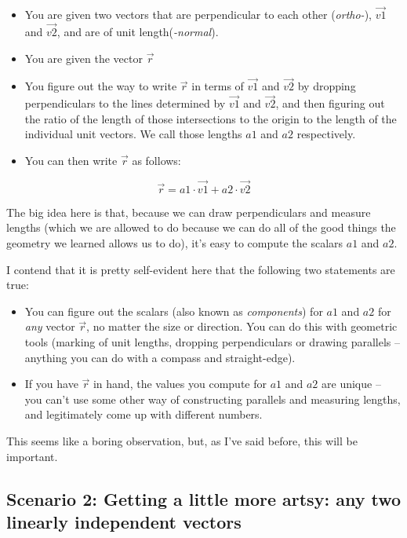 \documentclass[
]{book}
\providecommand{\tightlist}{%
  \setlength{\itemsep}{0pt}\setlength{\parskip}{0pt}}
\begin{document}
\begin{itemize}
\tightlist
\item
  You are given two vectors that are perpendicular to each other (\emph{ortho-}), \(\vec{v1}\) and \(\vec{v2}\), and are of unit length(\emph{-normal}).
\item
  You are given the vector \(\vec{r}\)
\item
  You figure out the way to write \(\vec{r}\) in terms of \(\vec{v1}\) and \(\vec{v2}\) by dropping perpendiculars to the lines determined by \(\vec{v1}\) and \(\vec{v2}\), and then figuring out the ratio of the length of those intersections to the origin to the length of the individual unit vectors. We call those lengths \(a1\) and \(a2\) respectively.
\item
  You can then write \(\vec{r}\) as follows:
\end{itemize}

\[\vec{r} = a1 \cdot \vec{v1} + a2 \cdot \vec{v2}\]

The big idea here is that, because we can draw perpendiculars and measure lengths (which we are allowed to do because we can do all of the good things the geometry we learned allows us to do), it's easy to compute the scalars \(a1\) and \(a2\).

I contend that it is pretty self-evident here that the following two statements are true:

\begin{itemize}
\tightlist
\item
  You can figure out the scalars (also known as \emph{components}) for \(a1\) and \(a2\) for \emph{any} vector \(\vec{r}\), no matter the size or direction. You can do this with geometric tools (marking of unit lengths, dropping perpendiculars or drawing parallels -- anything you can do with a compass and straight-edge).
\item
  If you have \(\vec{r}\) in hand, the values you compute for \(a1\) and \(a2\) are unique -- you can't use some other way of constructing parallels and measuring lengths, and legitimately come up with different numbers.
\end{itemize}

This seems like a boring observation, but, as I've said before, this will be important.

\hypertarget{scenario-2-getting-a-little-more-artsy-any-two-linearly-independent-vectors}{%
\subsection{Scenario 2: Getting a little more artsy: any two linearly independent vectors}\label{scenario-2-getting-a-little-more-artsy-any-two-linearly-independent-vectors}}
\end{document}
